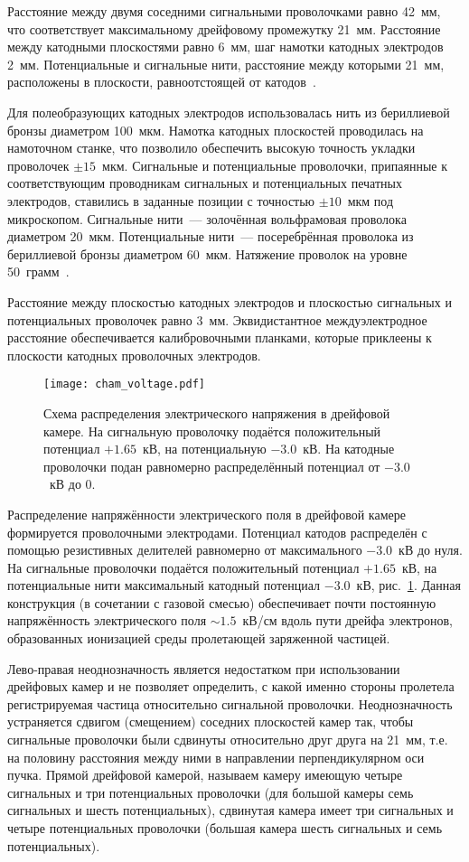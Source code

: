 Расстояние между двумя соседними сигнальными проволочками равно 42~мм, что
соответствует максимальному дрейфовому промежутку 21~мм. Расстояние между
катодными плоскостями равно 6~мм, шаг намотки катодных электродов 2~мм.
Потенциальные и сигнальные нити, расстояние между которыми 21~мм, расположены в
плоскости, равноотстоящей от катодов~\cite{vodopianov84}.

Для полеобразующих катодных электродов использовалась нить из бериллиевой бронзы
диаметром 100~мкм. Намотка катодных плоскостей проводилась на намоточном станке,
что позволило обеспечить высокую точность укладки проволочек $\pm 15$~мкм.
Сигнальные и потенциальные проволочки, припаянные к соответствующим проводникам
сигнальных и потенциальных печатных электродов, ставились в заданные позиции с
точностью $\pm 10$~мкм под микроскопом. Сигнальные нити~--- золочённая
вольфрамовая проволока диаметром 20~мкм. Потенциальные нити~--- посеребрённая
проволока из бериллиевой бронзы диаметром 60~мкм. Натяжение проволок на уровне
50~грамм~\cite{nigmanov76}.

Расстояние между плоскостью катодных электродов и плоскостью сигнальных и
потенциальных проволочек равно 3~мм. Эквидистантное междуэлектродное
расстояние обеспечивается калибровочными планками, которые приклеены к плоскости
катодных проволочных электродов.

\begin{figure}[h]
  \centering
  \texttt{[image: cham\_voltage.pdf]}
  \caption{Схема распределения электрического напряжения в дрейфовой камере.
    На сигнальную проволочку подаётся положительный потенциал $+1.65$~кВ, на
    потенциальную $-3.0$~кВ. На катодные проволочки подан равномерно
    распределённый потенциал от $-3.0$~кВ до 0.}
  \label{fig:cham_voltage}
\end{figure}

Распределение напряжённости электрического поля в дрейфовой камере формируется
проволочными электродами. \! Потенциал катодов распределён с помощью резистивных
делителей равномерно от максимального $-3.0$~кВ до нуля. На сигнальные
проволочки подаётся положительный потенциал $+1.65$~кВ, на потенциальные нити
максимальный катодный потенциал $-3.0$~кВ, рис.~\ref{fig:cham_voltage}. Данная
конструкция (в сочетании с газовой смесью) обеспечивает почти постоянную
напряжённость электрического поля $\sim 1.5$~кВ/см вдоль пути дрейфа электронов,
образованных ионизацией среды пролетающей заряженной частицей.

Лево-правая неоднозначность является недостатком при использовании дрейфовых
камер и не позволяет определить, с какой именно стороны пролетела регистрируемая
частица относительно сигнальной проволочки. Неоднозначность устраняется сдвигом
(смещением) соседних плоскостей камер так, чтобы сигнальные проволочки были
сдвинуты относительно друг друга на 21~мм, т.е. на половину расстояния между
ними в направлении перпендикулярном оси пучка. Прямой дрейфовой камерой,
называем камеру имеющую четыре сигнальных и три потенциальных проволочки (для
большой камеры семь сигнальных и шесть потенциальных), сдвинутая камера имеет
три сигнальных и четыре потенциальных проволочки (большая камера шесть
сигнальных и семь потенциальных).

